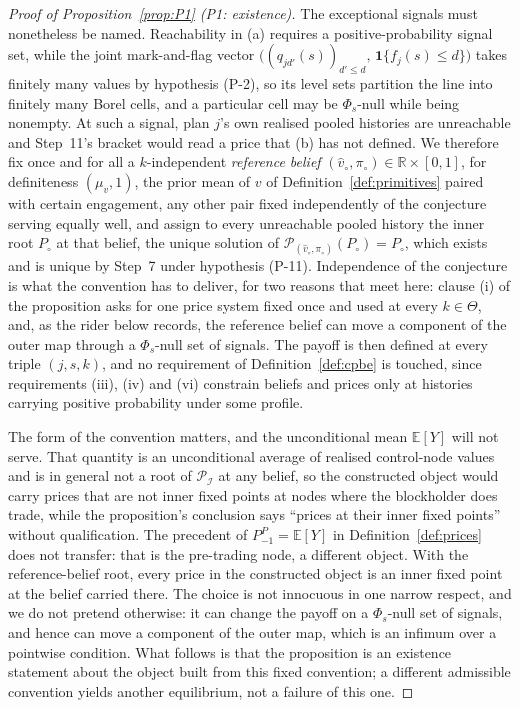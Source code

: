 \documentclass[11pt]{article}
\newcommand{\Eop}{\mathbb{E}}
\newcommand{\ind}{\mathbf{1}}
\begin{document}
\begin{proof}[Proof of Proposition~\ref{prop:P1} (P1: existence)]
The exceptional signals must nonetheless be named. Reachability in (a) requires a
positive-probability signal set, while the joint mark-and-flag vector
$\bigl((q_{jd'}(s))_{d' \le d},\,\ind\{f_j(s) \le d\}\bigr)$ takes finitely many values by hypothesis
(P-2), so its level sets partition the line into finitely many Borel cells, and a particular cell
may be $\Phi_s$-null while being nonempty. At such a signal, plan $j$'s own realised pooled histories
are unreachable and Step~11's bracket would read a price that (b) has not defined. We therefore fix
once and for all a $k$-independent \emph{reference belief} $(\hat v_\circ,\pi_\circ) \in \mathbb R
\times [0,1]$, for definiteness $(\mu_v,1)$, the prior mean of $v$ of
Definition~\ref{def:primitives} paired with certain engagement, any other pair fixed independently of
the conjecture serving equally well, and assign to every unreachable pooled history the inner root
$P_\circ$ at that belief, the unique solution of
$\mathcal P_{(\hat v_\circ,\pi_\circ)}(P_\circ) = P_\circ$, which exists and is unique by Step~7 under
hypothesis (P-11). Independence of the conjecture is what the convention has to deliver, for two
reasons that meet here: clause (i) of the proposition asks for one price system fixed once and used
at every $k \in \Theta$, and, as the rider below records, the reference belief can move a component
of the outer map through a $\Phi_s$-null set of signals. The payoff is then defined at every triple
$(j,s,k)$, and no requirement of Definition~\ref{def:cpbe} is touched, since requirements (iii), (iv)
and (vi) constrain beliefs and prices only at histories carrying positive probability under some
profile.

The form of the convention matters, and the unconditional mean $\Eop[Y]$ will not serve. That
quantity is an unconditional average of realised control-node values and is in general not a root of
$\mathcal P_{\mathcal I}$ at any belief, so the constructed object would carry prices that are not
inner fixed points at nodes where the blockholder does trade, while the proposition's conclusion says
``prices at their inner fixed points'' without qualification. The precedent of
$P_{-1}^P = \Eop[Y]$ in Definition~\ref{def:prices} does not transfer: that is the pre-trading node, a
different object. With the reference-belief root, every price in the constructed object is an inner
fixed point at the belief carried there. The choice is not innocuous in one narrow respect, and we do
not pretend otherwise: it can change the payoff on a $\Phi_s$-null set of signals, and hence can move
a component of the outer map, which is an infimum over a pointwise condition. What follows is that
the proposition is an existence statement about the object built from this fixed convention; a
different admissible convention yields another equilibrium, not a failure of this one.


\end{proof}
\end{document}

